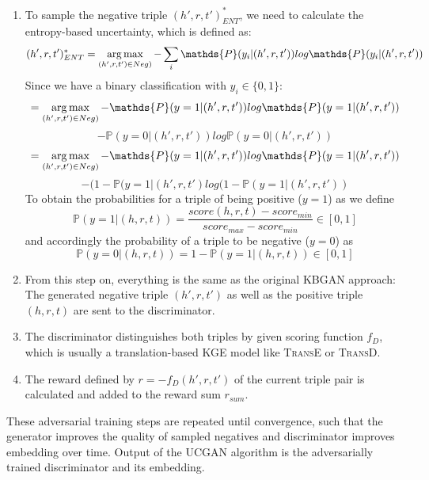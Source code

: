 \begin{enumerate}
    \item 
    To sample the negative triple $(h',r,t')^{*}_{ENT}$, we need to calculate the entropy-based uncertainty, which is defined as:
    $$(h',r,t')^{*}_{ENT} = \argmax_{(h',r,t') \in Neg)} - \sum_{i}{\mathds{P}(y_i | (h',r,t')) log \mathds{P}(y_i|(h',r,t'))}$$
    Since we have a binary classification with $y_i \in \{0,1\}$:\\
    $$= \argmax_{(h',r,t') \in Neg)} - \mathds{P}(y = 1| (h',r,t')) log \mathds{P}(y = 1|(h',r,t'))$$
    $$- \mathds{P}(y = 0| (h',r,t')) log \mathds{P}(y = 0|(h',r,t'))$$
    $$= \argmax_{(h',r,t') \in Neg)} - \mathds{P}(y = 1| (h',r,t')) log \mathds{P}(y = 1|(h',r,t'))$$
    $$- (1 - \mathds{P}(y = 1|(h',r,t') log(1 - \mathds{P}(y = 1|(h',r,t'))$$
    To obtain the probabilities for a triple of being positive ($y=1$) as we define
    \begin{equation}
        \mathds{P}(y = 1|(h, r, t)) = \frac{score(h, r, t) - score_{min}}{score_{max} - score_{min}} \in [0, 1]
    \end{equation}
    and accordingly the probability of a triple to be negative ($y=0$) as
    \begin{equation}
        \mathds{P}(y = 0|(h, r, t)) = 1 - \mathds{P}(y = 1|(h, r, t)) \in [0,1]
    \end{equation}
    
    \item 
    From this step on, everything is the same as the original \ac{KBGAN} approach:
    The generated negative triple $(h',r,t')$ as well as the positive triple $(h, r, t)$ are sent to the discriminator.
    
    \item 
    The discriminator distinguishes both triples by given scoring function $f_D$, which is usually a translation-based \ac{KGE} model like \textsc{TransE} or \textsc{TransD}.
    
    \item 
    The reward defined by $r = - f_D(h',r,t')$ of the current triple pair is calculated and added to the reward sum $r_{sum}$.
    
\end{enumerate}
These adversarial training steps are repeated until convergence, such that the generator improves the quality of sampled negatives and discriminator improves embedding over time.
Output of the \ac{UCGAN} algorithm is the adversarially trained discriminator and its embedding.

